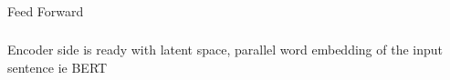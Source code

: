 \begin{frame}[fragile]\frametitle{}
\begin{center}
{\Large Feed Forward}
\end{center}
\end{frame}


			
			
		


			
			
		



			
		


\begin{frame}[fragile]\frametitle{}
\begin{center}
{\Large Encoder side is ready with latent space, parallel word embedding of the input sentence ie BERT}
\end{center}
\end{frame}



